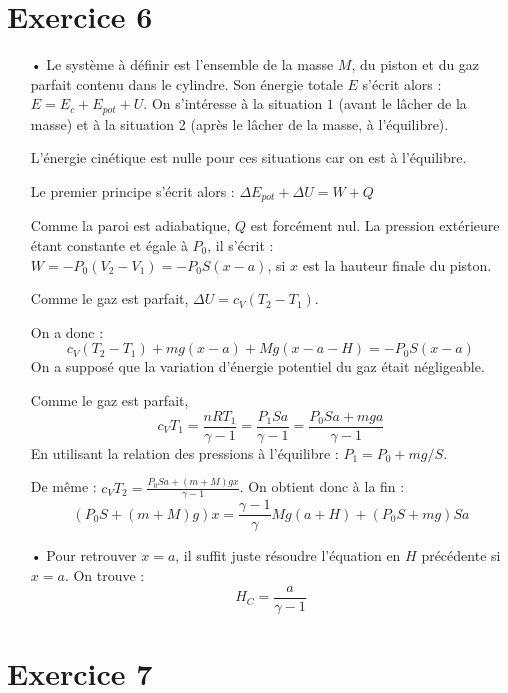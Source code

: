 \documentclass{report}
\begin{document}
\section*{Exercice 6}

\begin{itemize}
\item[•] Le système à définir est l'ensemble de la masse $M$, du piston et du gaz parfait contenu dans le cylindre. Son énergie totale $E$ s'écrit alors :$E = E_c + E_{pot} + U$. On s'intéresse à la situation $1$ (avant le lâcher de la masse) et à la situation 2 (après le lâcher de la masse, à l'équilibre).

L'énergie cinétique est nulle pour ces situations car on est à l'équilibre. 

Le premier principe s'écrit alors : $\Delta E_{pot} +\Delta U = W + Q$

Comme la paroi est adiabatique, $Q$ est forcément nul. La pression extérieure étant constante et égale à $P_0$, il s'écrit : $W=-P_0(V_2-V_1)=-P_0S(x-a)$, si $x$ est la hauteur finale du piston.

Comme le gaz est parfait, $\Delta U = c_V(T_2-T_1)$.

On a donc :
\begin{equation}
	c_V(T_2-T_1) + mg(x-a) + Mg(x-a-H)=-P_0S(x-a)
\end{equation}
On a supposé que la variation d'énergie potentiel du gaz était négligeable. 

Comme le gaz est parfait, 
\begin{equation}
c_VT_1=\frac{nRT_1}{\gamma-1}=\frac{P_1Sa}{\gamma-1}=\frac{P_0Sa+mga}{\gamma-1}
\end{equation}
En utilisant la relation des pressions à l'équilibre : $P_1=P_0+mg/S$.

De même : $c_VT_2=\frac{P_0Sa+(m+M)gx}{\gamma-1}$.
On obtient donc à la fin :
\begin{equation}
	(P_0S+(m+M)g)x = \frac{\gamma-1}{\gamma}Mg(a+H)+(P_0S+mg)Sa
\end{equation}

\item[•] Pour retrouver $x=a$, il suffit juste résoudre l'équation en $H$ précédente si $x=a$. On trouve :
\begin{equation}
	H_C=\frac{a}{\gamma-1}
\end{equation}

\end{itemize}

\section*{Exercice 7}
\end{document}
